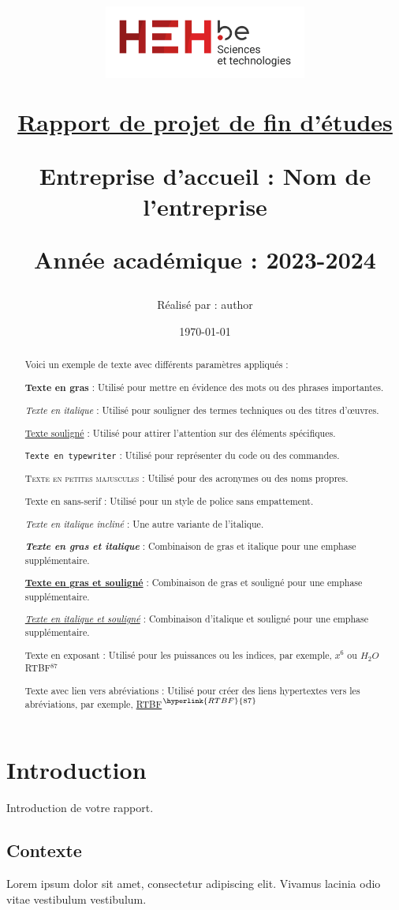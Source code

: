 \documentclass[a4paper, 12pt]{article}
\title{
    \begin{center}
        \includegraphics[width=0.5\textwidth]{img/logo_hehbe_tech.png}
    \end{center}
    \vspace{2cm}
    \begin{center}
        \underline{Rapport de projet de fin d'études}
    \end{center}
    \vspace{2cm}
    \begin{center}
        \fboxrule=0.3mm
        \fbox{
            \parbox{\textwidth}{
                \vspace{1cm}
                \centering
                \textbf{Titre du PFE Lorem ipsum dolor sit amet, consectetur adipiscing elit. Vivamus lacinia odio vitae}
                \vspace{1cm}
            }
        }
    \end{center}
    \vspace{2cm}
    \begin{center}
        \small Entreprise d'accueil : Nom de l'entreprise\\
    \end{center}
    \begin{center}
        \small Année académique : 2023-2024
    \end{center}
    \author{Réalisé par : author}
    \date{\today}

}
\begin{document}
\maketitle
\newpage
\begin{abstract}
    Voici un exemple de texte avec différents paramètres appliqués :
    
    \textbf{Texte en gras} : Utilisé pour mettre en évidence des mots ou des phrases importantes.
    
    \textit{Texte en italique} : Utilisé pour souligner des termes techniques ou des titres d'œuvres.
    
    \underline{Texte souligné} : Utilisé pour attirer l'attention sur des éléments spécifiques.
    
    \texttt{Texte en typewriter} : Utilisé pour représenter du code ou des commandes.
    
    \textsc{Texte en petites majuscules} : Utilisé pour des acronymes ou des noms propres.
    
    \textsf{Texte en sans-serif} : Utilisé pour un style de police sans empattement.
    
    \textsl{Texte en italique incliné} : Une autre variante de l'italique.
    
    \textbf{\textit{Texte en gras et italique}} : Combinaison de gras et italique pour une emphase supplémentaire.
    
    \textbf{\underline{Texte en gras et souligné}} : Combinaison de gras et souligné pour une emphase supplémentaire.
    
    \textit{\underline{Texte en italique et souligné}} : Combinaison d'italique et souligné pour une emphase supplémentaire.
    
    Texte en exposant : Utilisé pour les puissances ou les indices, par exemple, $x^6$ ou $H_2O$ RTBF$^{87}$
    
    Texte avec lien vers abréviations : Utilisé pour créer des liens hypertextes vers les abréviations, par exemple, \hyperlink{RTBF}{RTBF}$^{\hyperlink{RTBF}{87}}$

    
\end{abstract}

\newpage
\tableofcontents

\newpage
\section{Introduction}
Introduction de votre rapport.

\subsection{Contexte}
Lorem ipsum dolor sit amet, consectetur adipiscing elit. Vivamus lacinia odio vitae vestibulum vestibulum.
\end{document}
